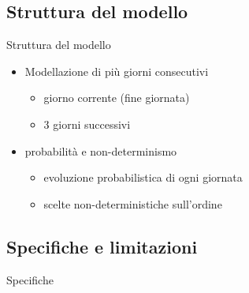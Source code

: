 \documentclass[9pt]{beamer}
\begin{document}
        \subsection{Struttura del modello}
            \begin{frame}{Struttura del modello}
              \begin{itemize}
                \item Modellazione di più giorni consecutivi
                \begin{itemize}
                  \item giorno corrente (fine giornata)
                  \item 3 giorni successivi
                \end{itemize}
                \item probabilità e non-determinismo
                \begin{itemize}
                  \item evoluzione probabilistica di ogni giornata
                  \item scelte non-deterministiche sull'ordine
                \end{itemize}
              \end{itemize}
              \begin{center}
              \end{center}
            \end{frame}
        
        \subsection{Specifiche e limitazioni}
            \begin{frame}{Specifiche}
            \end{frame}
            
\end{document}
